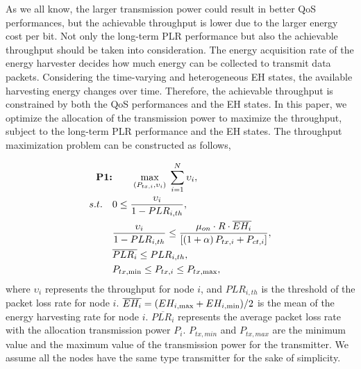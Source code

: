 \documentclass[journal,10pt]{IEEEtran}
\begin{document}
As we all know, the larger transmission power could result in better QoS performances, but the achievable throughput is lower due to the larger energy cost per bit. Not only the long-term PLR performance but also the achievable throughput should be taken into consideration. The energy acquisition rate of the energy harvester decides how much energy can be collected to transmit data packets. 
Considering the time-varying and heterogeneous EH states, the available harvesting energy changes over time. Therefore, the achievable throughput is constrained by both the QoS performances and the EH states. 
In this paper, we optimize the allocation of the transmission power to maximize the throughput, subject to the long-term PLR performance and the EH states. The throughput maximization problem can be constructed as follows,

\begin{subequations}\label{P1:PRCS} \small
\begin{align}
    \textbf{P1:}& \qquad\mathop {\max }\limits_{\small{({P_{tx,i},{\upsilon_i}})}} \; {\sum\limits_{i = 1}^{N} {{\upsilon_i}} } , \label{P1:obj} \\
    s.t.\quad %
		& {\rm{0}} \le {{{\upsilon_i}} \over {1 - PL{R_{i,th}}}},\label{P1:con1}\\
    & {{{\upsilon_i}} \over {1 - PL{R_{i,th}}}} \le {{{{\mu _{on}} \cdot R \cdot \overline{EH_{i}} } \over {\left[ {\left( {1 + \alpha } \right){P_{tx,i}} + {P_{ct,i}}} \right]}}},\label{P1:con2}\\
    & {\overline {PL{R_i}}  \le PL{R_{i,th}}},\label{P1:con3}\\
    & {{P_{tx,\min }} \le {P_{tx,i}} \le {P_{tx,\max }}}, \label{P1:con4}
\end{align}
\end{subequations}
where ${\upsilon_i}$ represents the throughput for node $i$, and $PLR_{i,th}$ is the threshold of the packet loss rate for node $i$.
$\overline{EH_{i}} ={{{\left( {E{H_{i,\max }} + E{H_{i,\min }}} \right)} \mathord{\left/
 {\vphantom {{\left( {E{H_{i,\max }} + E{H_{i,\min }}} \right)} {\rm{2}}}} \right.
 \kern-\nulldelimiterspace} {\rm{2}}}}$ is the mean of the energy harvesting rate for node $i$.
 $\overline {PL{R_i}}$ represents the average packet loss rate with the allocation transmission power $P_{i}$. $P_{tx,min}$ and $P_{tx,max}$ are the minimum value and the maximum value of the transmission power for the transmitter. We assume all the nodes have the same type transmitter for the sake of simplicity.
\end{document}
